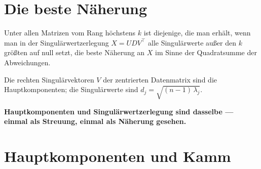 \section{Die beste Näherung}

\begin{merksatz}
Unter allen Matrizen vom Rang höchstens $k$ ist diejenige, die man erhält, wenn man in der Singulärwertzerlegung $X = UDV^{\!\top}$ alle Singulärwerte außer den $k$ größten auf null setzt, die beste Näherung an $X$ im Sinne der Quadratsumme der Abweichungen.

\begin{center}
\begin{minipage}{0.88\textwidth}
\end{minipage}
\end{center}

Die rechten Singulärvektoren $V$ der zentrierten Datenmatrix sind die Hauptkomponenten; die Singulärwerte sind $d_j = \sqrt{(n-1)\,\lambda_j}$.

\begin{center}
\begin{minipage}{0.9\textwidth}
\textbf{Hauptkomponenten und Singulärwertzerlegung sind dasselbe --- einmal als Streuung, einmal als Näherung gesehen.}
\end{minipage}
\end{center}
\end{merksatz}

\section{Hauptkomponenten und Kamm}

